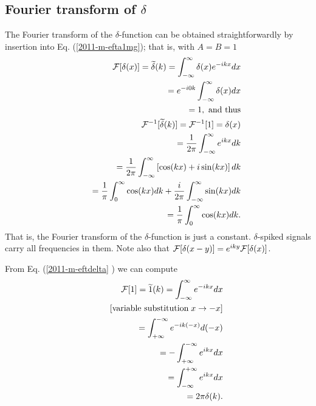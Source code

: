 \subsection{Fourier transform  of $\delta$}
The Fourier transform of the $\delta$-function can be obtained straightforwardly
by insertion into Eq. (\ref{2011-m-efta1mg}); that is,
with $A=B=1$
\begin{equation}
\begin{split}
  {\cal F}[\delta (x)]=\widetilde{\delta}(k)=   \int_{-\infty}^\infty  \delta(x) e^{-i{kx}} dx   \\
\qquad =    e^{-i{0k}}  \int_{-\infty}^\infty  \delta(x)  dx   \\
\qquad =    1, \textrm{ and thus}
\\
 {\cal F}^{-1}[\widetilde{\delta} (k)]=
 {\cal F}^{-1}[1]=\delta (x)  \\
\qquad = \frac{1}{2\pi}  \int_{-\infty}^\infty    e^{i{kx}} dk\\
\qquad =
\frac{1}{2\pi}  \int_{-\infty}^\infty  \left[  \cos(kx)+ i \sin(kx) \right] dk\\
\qquad =
\frac{1}{ \pi}  \int_{0}^\infty    \cos(kx) dk   +
\frac{ i }{2\pi}  \int_{-\infty}^\infty   \sin(kx)   dk\\
\qquad =
\frac{1}{ \pi}  \int_{0}^\infty    \cos(kx) dk
.
\end{split}
\label{2011-m-eftdelta}
\end{equation}
That is, the Fourier transform of the $\delta$-function is just a constant.
$\delta$-spiked signals carry all frequencies in them.
Note also that  ${\cal F}[\delta (x-y)]=e^{i{ky}}{\cal F}[\delta (x)]$.

From Eq. (\ref{2011-m-eftdelta} ) we can compute
\begin{equation}
\begin{split}
{\cal F}[1]=\widetilde{1}(k)=   \int_{-\infty}^\infty    e^{-i{kx}} dx   \\
\qquad [\textrm{variable substitution}\; x \rightarrow -x]\\
\qquad =   \int_{+\infty}^{-\infty}    e^{-i{k(-x)}} d(-x)   \\
\qquad =  - \int_{+\infty}^{-\infty}    e^{i{kx}} dx   \\
\qquad =    \int_{-\infty}^{+\infty}    e^{i{kx}} dx   \\
\qquad =    2\pi \delta (k)
.
\end{split}
\label{2011-m-eftdelta1}
\end{equation}


